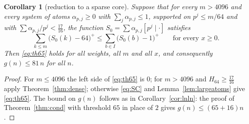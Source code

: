 \documentclass[11pt]{article}
\newtheorem{corollary}[theorem]{Corollary}
\theoremstyle{definition}
\begin{document}
\begin{corollary}[reduction to a sparse core]\label{cor:sparsecore}
Suppose that for every $m>4096$ and every system of atoms $\alpha_{p,j}\ge0$ with $\sum_j\alpha_{p,j}\le1$, supported on $p^j\le m/64$ and
with $\sum\alpha_{p,j}/p^j<\tfrac{17}{16}$, the function $S_0=\sum\alpha_{p,j}[p^j\mid\cdot]$ satisfies
\begin{equation}\label{eq:SC}
\sum_{k\le m}\bigl(S_0(k)-64\bigr)^+\le\sum_{b\in I}\bigl(S_0(b)-1\bigr)^+\qquad\text{for every }x\ge0 .
\end{equation}
Then \eqref{eq:th65} holds for all weights, all $m$ and all $x$, and consequently $g(n)\le81\,n$ for all $n$.
\end{corollary}
\begin{proof}
For $m\le4096$ the left side of \eqref{eq:th65} is $0$; for $m>4096$ and $H_{64}\ge\tfrac{17}{16}$ apply Theorem~\ref{thm:dense}; otherwise
\eqref{eq:SC} and Lemma~\ref{lem:largeatoms} give \eqref{eq:th65}. The bound on $g(n)$ follows as in Corollary~\ref{cor:lnln}: the proof of Theorem~\ref{thm:cond} with threshold $65$ in place of $2$ gives $g(n)\le(65+16)n$.
\end{proof}
\end{document}
